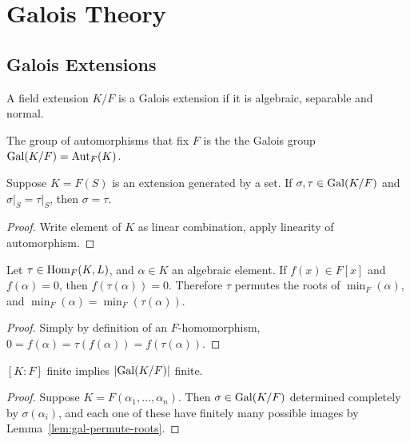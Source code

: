 \chapter{Galois Theory}\label{sec:galois}

\section{Galois Extensions}

\begin{definition}
    A field extension \(K/F\) is a Galois extension
    if it is algebraic, separable and normal.
\end{definition}
\begin{definition}
    The group of automorphisms that fix \(F\)
    is the the Galois group \(\operatorname{Gal}(K/F) = \operatorname{Aut}_F(K)\).
\end{definition}

\begin{lemma}
    Suppose \(K = F(S)\) is an extension generated by a set.
    If \(\sigma,\tau \in \operatorname{Gal}(K/F)\) and \(\sigma\vert_S = \tau\vert_S\),
    then \(\sigma  = \tau\).
\end{lemma}
\begin{proof}
    Write element of \(K\) as linear combination,
    apply linearity of automorphism.
\end{proof}
\begin{lemma}\label{lem:gal-permute-roots}
    Let \(\tau \in \operatorname{Hom}_F(K,L)\), and \(\alpha \in K\) an algebraic element.
    If \(f(x) \in F[x]\) and \(f(\alpha) = 0\),
    then \(f(\tau(\alpha)) = 0\).
    Therefore \(\tau\) permutes the roots of \(\min_F(\alpha)\),
    and \(\min_F(\alpha) = \min_F(\tau(\alpha))\).
\end{lemma}
\begin{proof}
    Simply by definition of an \(F\)-homomorphism,
    \(0 = f(\alpha) = \tau(f(\alpha)) = f(\tau(\alpha))\).
\end{proof}
\begin{corollary}
    \([K:F]\) finite implies \(\abs{\operatorname{Gal}(K/F)}\) finite.
\end{corollary}
\begin{proof}
    Suppose \(K = F(\alpha_1,\hdots,\alpha_n)\).
    Then \(\sigma \in \operatorname{Gal}(K/F)\) determined completely by \(\sigma(\alpha_i)\),
    and each one of these have finitely many possible images
    by Lemma~\ref{lem:gal-permute-roots}.
\end{proof}

